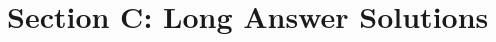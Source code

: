 \documentclass[12pt,a4paper]{article}
\newcounter{questioncounter}
\newcounter{mcqcounter}
\begin{document}
\setcounter{mcqcounter}{0}


\newpage

\section*{Section C: Long Answer Solutions}

\setcounter{questioncounter}{0}


\newpage


\newpage


\newpage

\end{document}
